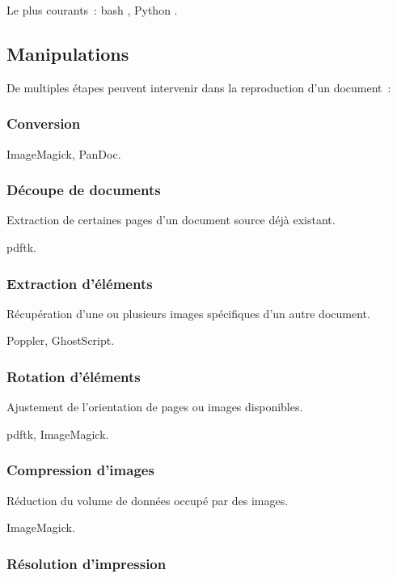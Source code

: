 Le plus courants : \gls{bash} \cite{bash}, Python \cite{py}.

\pagebreak

\subsection{Manipulations}

De multiples étapes peuvent intervenir dans la reproduction d’un document :

\subsubsection{Conversion}

ImageMagick, PanDoc.

\subsubsection{Découpe de documents}

Extraction de certaines pages d’un document source déjà existant.

\gls{pdftk}.

\subsubsection{Extraction d’éléments}

Récupération d’une ou plusieurs images spécifiques d’un autre document.

Poppler, GhostScript.

\subsubsection{Rotation d’éléments}

Ajustement de l’orientation de pages ou images disponibles.

\gls{pdftk}, ImageMagick.

\subsubsection{Compression d’images}

Réduction du volume de données occupé par des images.

ImageMagick.

\subsubsection{Résolution d’impression}

